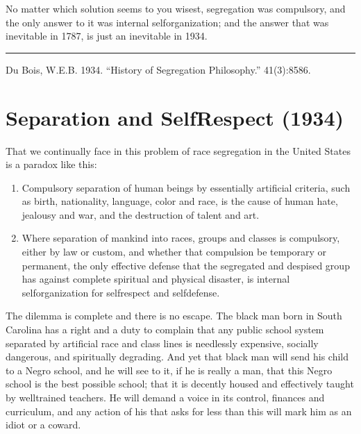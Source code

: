 \documentclass[letterpaper,10pt,english]{jupyterBook}
\begin{document}
\sphinxAtStartPar
No matter which solution seems to you wisest, segregation was compulsory, and the only answer to it was internal self\sphinxhyphen{}organization; and the answer that was inevitable in 1787, is just an inevitable in 1934.


\bigskip\hrule\bigskip


\sphinxAtStartPar
{} Du Bois, W.E.B. 1934. “History of Segregation Philosophy.” 41(3):85\sphinxhyphen{}86.


\section{Separation and Self\sphinxhyphen{}Respect (1934)}
\label{\detokenize{Volumes/41/03/separation_and_selfrespect:separation-and-self-respect-1934}}\label{\detokenize{Volumes/41/03/separation_and_selfrespect::doc}}
\sphinxAtStartPar
That we continually face in this problem of race segregation in the United States is a paradox like this:
\begin{enumerate}
%
\item {} 
\sphinxAtStartPar
Compulsory separation of human beings by essentially artificial criteria, such as birth, nationality, language, color and race, is the cause of human hate, jealousy and war, and the destruction of talent and art.

\item {} 
\sphinxAtStartPar
Where separation of mankind into races, groups and classes is compulsory, either by law or custom, and whether that compulsion be temporary or permanent, the only effective defense that the segregated and despised group has against complete spiritual and physical disaster, is internal self\sphinxhyphen{}organization for self\sphinxhyphen{}respect and self\sphinxhyphen{}defense.

\end{enumerate}

\sphinxAtStartPar
The dilemma is complete and there is no escape. The black man born in South Carolina has a right and a duty to complain that any public school system separated by artificial race and class lines is needlessly expensive, socially dangerous, and spiritually degrading. And yet that black man will send his child to a Negro school, and he will see to it, if he is really a man, that this Negro school is the best possible school; that it is decently housed and effectively taught by well\sphinxhyphen{}trained teachers. He will demand a voice in its control, finances and curriculum, and any action of his that asks for less than this will mark him as an idiot or a coward.
\end{document}

